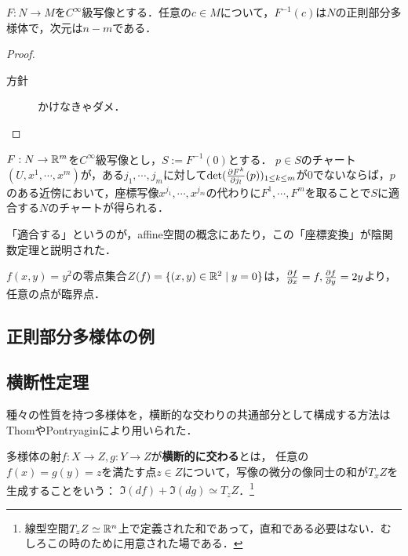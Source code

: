 \documentclass[uplatex,dvipdfmx]{jsreport}
\begin{document}
\begin{theorem}\label{thm-the-implicit-function-theorem}
    $F:N\to M$を$C^\infty$級写像とする．任意の$c\in M$について，$F^{-1}(c)$は$N$の正則部分多様体で，次元は$n-m$である．
\end{theorem}
\begin{proof}\mbox{}
    \begin{description}
        \item[方針] かけなきゃダメ．
    \end{description}
\end{proof}

\begin{lemma}[算譜抽出]
    $F:N\to\mathbb{R}^m$を$C^\infty$級写像とし，$S:=F^{-1}(0)$とする．
    $p\in S$のチャート$(U,x^1,\cdots,x^m)$が，ある$j_1,\cdots,j_m$に対して$\det(\frac{\partial F^k}{\partial j_l}(p))_{1\le k\le m}$が$0$でないならば，$p$のある近傍において，座標写像$x^{j_1},\cdots,x^{j_m}$の代わりに$F^1,\cdots,F^m$を取ることで$S$に適合する$N$のチャートが得られる．
\end{lemma}
\begin{remarks}
    「適合する」というのが，affine空間の概念にあたり，この「座標変換」が陰関数定理と説明された．
\end{remarks}
\begin{remark}
    $f(x,y)=y^2$の零点集合$Z(f)=\{(x,y)\in\mathbb{R}^2\mid y=0\}$は，$\frac{\partial f}{\partial x}=f,\frac{\partial f}{\partial y}=2y$より，任意の点が臨界点．
\end{remark}

\subsection{正則部分多様体の例}

\subsection{横断性定理}

\begin{tcolorbox}[colframe=ForestGreen, colback=ForestGreen!10!white,breakable,colbacktitle=ForestGreen!40!white,coltitle=black,fonttitle=\bfseries\sffamily,
title=]
    種々の性質を持つ多様体を，横断的な交わりの共通部分として構成する方法はThomやPontryaginにより用いられた．
\end{tcolorbox}

\begin{definition}[transversality]
    多様体の射$f:X\to Z,g:Y\to Z$が\textbf{横断的に交わる}とは，
    任意の$f(x)=g(y)=z$を満たす点$z\in Z$について，写像の微分の像同士の和が$T_xZ$を生成することをいう：
    $\Im(df)+\Im(dg)\simeq T_zZ$．\footnote{線型空間$T_zZ\simeq\mathbb{R}^n$上で定義された和であって，直和である必要はない．むしろこの時のために用意された場である．}
\end{definition}
\end{document}
